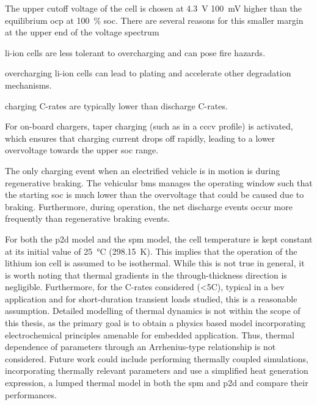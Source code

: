 The  upper  cutoff voltage  of  the  cell  is  chosen at  \SI{4.3}{\volt}  \ie{}
\approx\SI{100}{\milli  \volt}   higher  than   the  equilibrium   \gls{ocp}  at
\SI{100}{\percent} \gls{soc}. There are several  reasons for this smaller margin
at the upper end of the voltage spectrum
\begin{description}[leftmargin=!,labelwidth=\widthof{\bfseries low
    probabilities},itemsep=1ex]

    \item[safety] li-ion  cells are less  tolerant to overcharging and  can pose
    fire hazards.

    \item[degradation]  overcharging  li-ion  cells  can  lead  to  plating  and
    accelerate other degradation mechanisms.

    \item[low  C-rates]  charging C-rates  are  typically  lower than  discharge
    C-rates.

    \item[CCCV charging]  For on-board  chargers, taper charging  (such as  in a
    \gls{cccv} profile) is activated, which  ensures that charging current drops
    off  rapidly, leading  to a  lower overvoltage  towards the  upper \gls{soc}
    range.

    \item[low probabilities] The only charging event when an electrified vehicle
    is in motion is during regenerative braking. The vehicular \gls{bms} manages
    the operating window such that the starting \gls{soc} is much lower than the
    overvoltage  that  could  be  caused due  to  braking.  Furthermore,  during
    operation, the net discharge events  occur more frequently than regenerative
    braking events.

\end{description}

For  both the  \gls{p2d} model  and the  \gls{spm} model,  the cell  temperature
is   kept   constant   at   its   initial   value   of   \SI{25}{\degreeCelsius}
(\SI{298.15}{\kelvin}). This implies that the  operation of the lithium ion cell
is assumed  to be isothermal.  While this  is not true  in general, it  is worth
noting that thermal gradients in  the through-thickness direction is negligible.
 Furthermore, for  the C-rates considered (<5C), typical
in a \gls{bev} application and  for short-duration transient loads studied, this
is a reasonable assumption. Detailed modelling of thermal dynamics is not within
the scope of this thesis, as the primary goal is to obtain a physics based model
incorporating  electrochemical  principles  amenable for  embedded  application.
Thus, thermal dependence of parameters through an Arrhenius-type relationship is
not  considered.    Future   work  could   include  performing   thermally  coupled
simulations, incorporating  thermally relevant  parameters and use  a simplified
heat generation expression,  \eg{} a lumped thermal model in  both the \gls{spm}
and \gls{p2d} and compare their performances.

